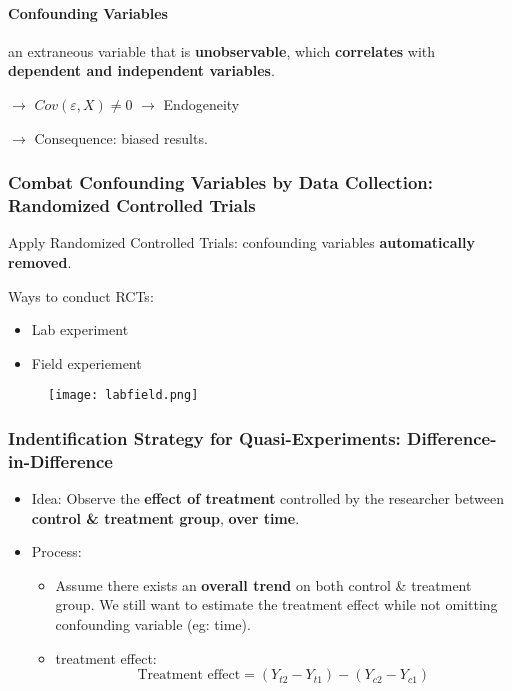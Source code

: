 \paragraph{Confounding Variables} an extraneous variable that is \textbf{unobservable}, which \textbf{correlates} with \textbf{dependent and independent variables}.

$\rightarrow$ $Cov(\varepsilon, X) \neq 0$ $\rightarrow$ Endogeneity

$\rightarrow$ Consequence: biased results.

\subsubsection{Combat Confounding Variables by Data Collection: Randomized Controlled Trials}
Apply Randomized Controlled Trials: confounding variables \textbf{automatically removed}.

Ways to conduct RCTs:
\begin{itemize}
	\item Lab experiment
	\item Field experiement
\end{itemize}
\begin{figure}[H]
	\centering
	\texttt{[image: labfield.png]}
\end{figure}
\subsubsection{Indentification Strategy for Quasi-Experiments: Difference-in-Difference}
\begin{itemize}
	\item Idea: Observe the \textbf{effect of treatment} controlled by the researcher between \textbf{control \& treatment group}, \textbf{over time}. 
	\item Process:
	\begin{itemize}
		\item Assume there exists an \textbf{overall trend} on both control \& treatment group. We still want to estimate the treatment effect while not omitting confounding variable (eg: time). 
		\item treatment effect:
		$$\text{Treatment effect} = (Y_{t2} - Y_{t1}) - (Y_{c2} - Y_{c1})$$
	\end{itemize}
\end{itemize}




